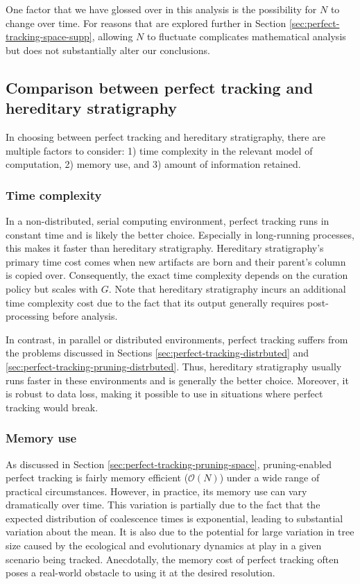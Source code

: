 One factor that we have glossed over in this analysis is the possibility for $N$ to change over time.
For reasons that are explored further in Section \ref{sec:perfect-tracking-space-supp}, allowing $N$ to fluctuate complicates mathematical analysis but does not substantially alter our conclusions.

\subsection{Comparison between perfect tracking and hereditary stratigraphy}

In choosing between perfect tracking and hereditary stratigraphy, there are multiple factors to consider: 1) time complexity in the relevant model of computation, 2) memory use, and 3) amount of information retained.

\subsubsection{Time complexity}

In a non-distributed, serial computing environment, perfect tracking runs in constant time and is likely the better choice.
Especially in long-running processes, this makes it faster than hereditary stratigraphy.
Hereditary stratigraphy's primary time cost comes when new artifacts are born and their parent's column is copied over.
Consequently, the exact time complexity depends on the curation policy but scales with $G$.
Note that hereditary stratigraphy incurs an additional time complexity cost due to the fact that its output generally requires post-processing before analysis.

In contrast, in parallel or distributed environments, perfect tracking suffers from the problems discussed in Sections \ref{sec:perfect-tracking-distrbuted} and \ref{sec:perfect-tracking-pruning-distrbuted}.
Thus, hereditary stratigraphy usually runs faster in these environments and is generally the better choice.
Moreover, it is robust to data loss, making it possible to use in situations where perfect tracking would break.

\subsubsection{Memory use}

As discussed in Section \ref{sec:perfect-tracking-pruning-space}, pruning-enabled perfect tracking is fairly memory efficient ($\mathcal{O}(N)$) under a wide range of practical circumstances.
However, in practice, its memory use can vary dramatically over time.
This variation is partially due to the fact that the expected distribution of coalescence times is exponential, leading to substantial variation about the mean.
It is also due to the potential for large variation in tree size caused by the ecological and evolutionary dynamics at play in a given scenario being tracked.
Anecdotally, the memory cost of perfect tracking often poses a real-world obstacle to using it at the desired resolution.

